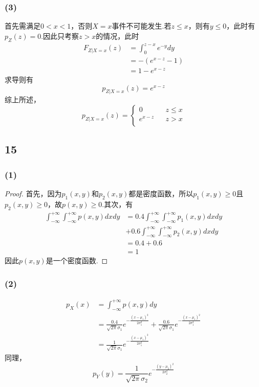 \documentclass[twocolumn]{article}
\begin{document}
\begin{CJK}{UTF8}{gbsn}
			\subsubsection*{(3)}
				首先需满足$0<x<1$，否则$X=x$事件不可能发生.若$z\le x$，则有$y\le0$，此时有$p_Z(z)=0$.因此只考察$z>x$的情况，此时\begin{align*}
					F_{Z|X=x}(z) & = \int_{0}^{z-x}e^{-y}dy\\
					& = -(e^{x-z}-1)\\
					& = 1-e^{x-z}
				\end{align*}
				求导则有\[p_{Z|X=x}(z)=e^{x-z}\]综上所述，\begin{equation*}
				p_{Z|X=x}(z)=\left\{
				\begin{array}{rcl}
				0 & & {z\le x}\\
				e^{x-z} & & {z>x}\\
				\end{array} \right.
				\end{equation*}
			\subsection*{15}
			\subsubsection*{(1)}
				\begin{proof}
					首先，因为$p_1(x,y)$和$p_2(x,y)$都是密度函数，所以$p_1(x,y)\ge0$且$p_2(x,y)\ge0$，故$p(x,y)\ge0$.其次，有\begin{align*}
						\int_{-\infty}^{+\infty}\int_{-\infty}^{+\infty}p(x,y)dxdy & = 0.4\int_{-\infty}^{+\infty}\int_{-\infty}^{+\infty}p_1(x,y)dxdy\\ & +0.6\int_{-\infty}^{+\infty}\int_{-\infty}^{+\infty}p_2(x,y)dxdy\\
						& = 0.4+0.6\\
						& = 1
					\end{align*}
					因此$p(x,y)$是一个密度函数.
				\end{proof}
			\subsubsection*{(2)}
				\begin{align*}
					p_X(x) & =\int_{-\infty}^{+\infty}p(x,y)dy\\
					& = \frac{0.4}{\sqrt{2\pi}\sigma_1}e^{-\frac{(x-\mu_1)^2}{2\sigma_1^2}}+\frac{0.6}{\sqrt{2\pi}\sigma_1}e^{-\frac{(x-\mu_1)^2}{2\sigma_1^2}}\\
					& = \frac{1}{\sqrt{2\pi}\sigma_1}e^{-\frac{(x-\mu_1)^2}{2\sigma_1^2}}
				\end{align*}
				同理，\[p_Y(y) = \frac{1}{\sqrt{2\pi}\sigma_2}e^{-\frac{(y-\mu_2)^2}{2\sigma_2^2}}\]

\end{CJK}
\end{document}
